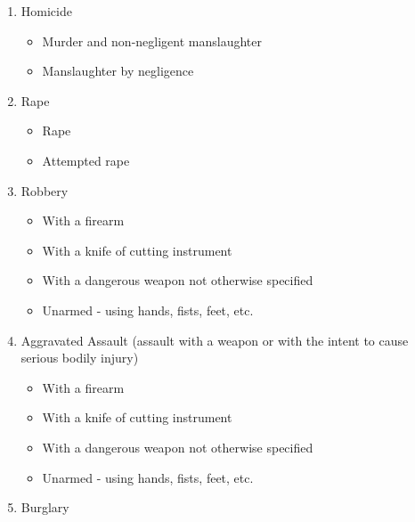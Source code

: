 \documentclass[
]{krantz}
\providecommand{\tightlist}{%
  \setlength{\itemsep}{0pt}\setlength{\parskip}{0pt}}
\begin{document}
\begin{enumerate}
\def\labelenumi{\arabic{enumi}.}
\tightlist
\item
  Homicide

  \begin{itemize}
  \tightlist
  \item
    Murder and non-negligent manslaughter\\
  \item
    Manslaughter by negligence
  \end{itemize}
\item
  Rape

  \begin{itemize}
  \tightlist
  \item
    Rape\\
  \item
    Attempted rape\\
  \end{itemize}
\item
  Robbery

  \begin{itemize}
  \tightlist
  \item
    With a firearm\\
  \item
    With a knife of cutting instrument\\
  \item
    With a dangerous weapon not otherwise specified\\
  \item
    Unarmed - using hands, fists, feet, etc.\\
  \end{itemize}
\item
  Aggravated Assault (assault with a weapon or with the
  intent to cause serious bodily injury)

  \begin{itemize}
  \tightlist
  \item
    With a firearm\\
  \item
    With a knife of cutting instrument\\
  \item
    With a dangerous weapon not otherwise specified\\
  \item
    Unarmed - using hands, fists, feet, etc.\\
  \end{itemize}
\item
  Burglary


\end{enumerate}
\end{document}

